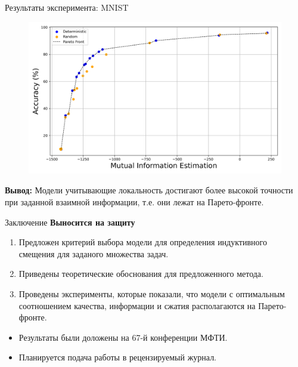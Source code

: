 \documentclass{beamer}
\begin{document}
\begin{frame}{Результаты эксперимента: MNIST}
\begin{figure}
    \includegraphics[width=1\textwidth]{conv_pareto_front.png}
\end{figure}
\textbf{Вывод:} Модели учитывающие локальность достигают более высокой точности при заданной взаимной информации, т.е. они лежат на Парето-фронте.
\end{frame}
\begin{frame}{Заключение}
\textbf{Выносится на защиту}
\begin{enumerate}
    \item Предложен критерий выбора модели для определения индуктивного смещения для заданого множества задач.
    \item Приведены теоретические обоснования для предложенного метода.
    \item Проведены эксперименты, которые показали, что модели с оптимальным соотношением качества, информации и сжатия располагаются на Парето-фронте.
\end{enumerate}
\vspace{3mm}
\begin{itemize}
    \item Результаты были доложены на 67-й конференции МФТИ.
    \item Планируется подача работы в рецензируемый журнал.
\end{itemize}
\end{frame}
\end{document}
